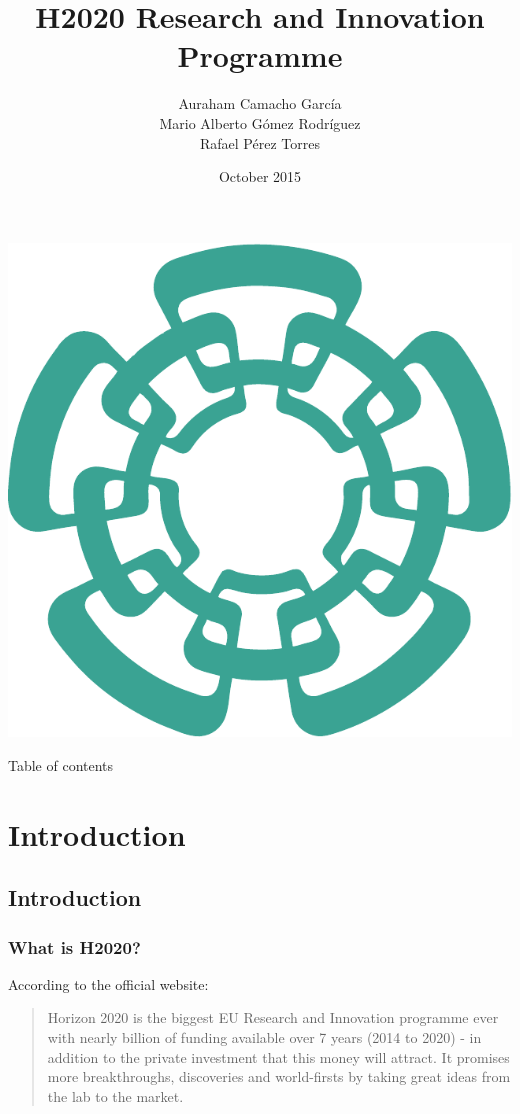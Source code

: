 \documentclass[compress,9pt,xcolor={dvipsnames,table}]{beamer}
\title[H2020 Research and Innovation Programme]{H2020 Research and Innovation Programme}
\author[acamacho, mgomez, rperez]{Auraham Camacho García\\Mario Alberto Gómez Rodríguez\\Rafael Pérez Torres}
\institute[Cinvestav Tamaulipas]{Doctorate seminar\\Cinvestav Tamaulipas}
\date{October 2015}
\begin{document}
\begin{frame}[plain]
  \begin{center}
  \includegraphics[scale=0.12]{../../../resources/images/vectors/cinvestav-logo-no-text}
  \end{center}
  \titlepage
  
\end{frame}


\begin{frame}{Table of contents}
	\tableofcontents[hideallsubsections]
\end{frame}

\section{Introduction}
\subsection{Introduction}
\begin{frame}\frametitle{What is H2020?}
According to the official website:
\begin{quotation}
Horizon 2020 is the biggest EU Research and Innovation programme ever with nearly  billion of funding available over 7 years (2014 to 2020) - in addition to the private investment that this money will attract. It promises more breakthroughs, discoveries and world-firsts by taking great ideas from the lab to the market.
\end{quotation}

\end{frame}
\end{document}
